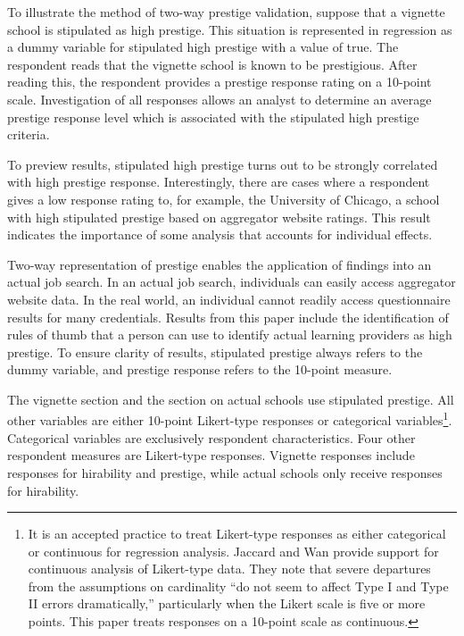 \documentclass[review]{elsarticle}
\begin{document}
To illustrate the method of two-way prestige validation,
suppose that a vignette school is stipulated as high prestige.
This situation is represented in regression as a dummy variable for stipulated high prestige with a value of true.
The respondent reads that the vignette school is known to be prestigious.
After reading this, the respondent provides a prestige response rating on a 10-point scale.
Investigation of all responses allows an analyst to determine an average prestige response level which is associated with
the stipulated high prestige criteria.

To preview results, stipulated high prestige turns out to be strongly correlated with high prestige response.
Interestingly, there are cases where a respondent gives a low response rating to, for example,
the University of Chicago, a school with high stipulated prestige based on aggregator website ratings.
This result indicates the importance of some analysis that accounts for individual effects.

Two-way representation of prestige enables the application of findings into an actual job search.
In an actual job search, individuals can easily access aggregator website data.
In the real world, an individual cannot readily access questionnaire results for many credentials.
Results from this paper include the identification of rules of thumb
that a person can use to identify actual learning providers as high prestige.
To ensure clarity of results, stipulated prestige always refers to the dummy variable, and prestige response refers to the 10-point measure.

The vignette section and the section on actual schools use stipulated prestige.
All other variables are either 10-point Likert-type responses or categorical variables\footnote{
    It is an accepted practice to treat Likert-type responses as either categorical or continuous for regression analysis.
    Jaccard and Wan provide support for continuous analysis of Likert-type data.
    They note that severe departures from the assumptions on cardinality ``do not seem to affect Type I and Type II errors dramatically,''
    particularly when the Likert scale is five or more points\cite{jaccard1996lisrel}.
    This paper treats responses on a 10-point scale as continuous.
}.
Categorical variables are exclusively respondent characteristics.
Four other respondent measures are Likert-type responses.
Vignette responses include responses for hirability and prestige,
while actual schools only receive responses for hirability.
\end{document}
